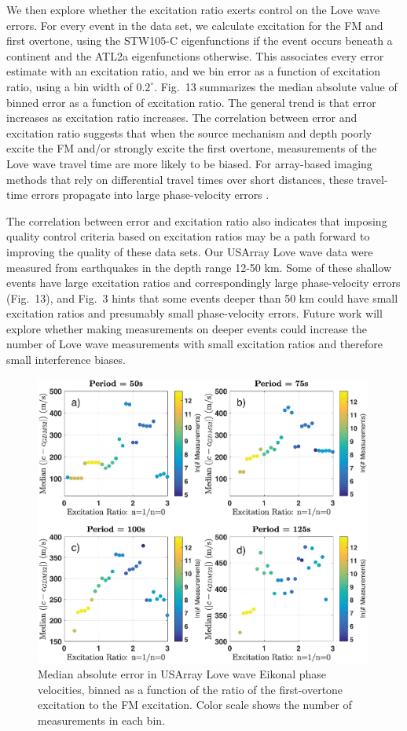\documentclass[extra,mreferee]{gji}
\begin{document}
We then explore whether the excitation ratio exerts control on the Love wave errors. For every event in the data set, we calculate excitation for the FM and first overtone, using the STW105-C eigenfunctions if the event occurs beneath a continent and the ATL2a eigenfunctions otherwise. This associates every error estimate with an excitation ratio, and we bin error as a function of excitation ratio, using a bin width of $0.2^\circ$. Fig.\ 13 summarizes the median absolute value of binned error as a function of excitation ratio. The general trend is that error increases as excitation ratio increases. The correlation between error and excitation ratio suggests that when the source mechanism and depth poorly excite the FM and/or strongly excite the first overtone, measurements of the Love wave travel time are more likely to be biased. For array-based imaging methods that rely on differential travel times over short distances, these travel-time errors propagate into large phase-velocity errors \citep{foster2014overtone}. 

The correlation between error and excitation ratio also indicates that imposing quality control criteria based on excitation ratios may be a path forward to improving the quality of these data sets. Our USArray Love wave data were measured from earthquakes in the depth range 12-50 km. Some of these shallow events have large excitation ratios and correspondingly large phase-velocity errors (Fig.\ 13), and Fig.\ 3 hints that some events deeper than 50 km could have small excitation ratios and presumably small phase-velocity errors. Future work will explore whether making measurements on deeper events could increase the number of Love wave measurements with small excitation ratios and therefore small interference biases.

\begin{figure}
 \includegraphics[width=0.99\textwidth]{Fig13_Sver.eps}
 \caption{Median absolute error in USArray Love wave Eikonal phase velocities, binned as a function of the ratio of the first-overtone excitation to the FM excitation. Color scale shows the number of measurements in each bin. }
\end{figure}
     
\end{document}
